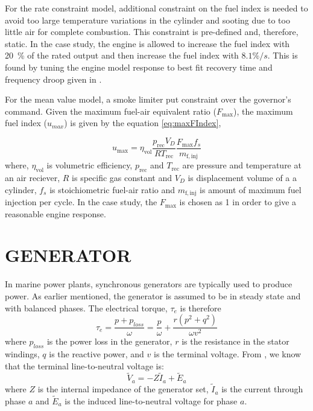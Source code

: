 \documentclass[twocolumn,10pt]{asme2e}
\begin{document}
For the rate constraint model, additional constraint on the fuel index is needed to avoid too large temperature variations in the cylinder and sooting due to too little air for complete combustion. This constraint is pre-defined and, therefore, static. In the case study, the engine is allowed to increase the fuel index with 20~\% of the rated output and then increase the fuel index with $8.1 \%/s$. This is found by tuning the engine model response to best fit recovery time and frequency droop given in \cite{MANEnginesandSystems2013}.

For the mean value model, a smoke limiter put constraint over the governor's command. Given the maximum fuel-air equivalent ratio ($F_\mathrm{max}$), the maximum fuel index ($u_{max}$) is given by the equation \ref{eq:maxFIndex},

\begin{equation}
\label{eq:maxFIndex}
u_\mathrm{max} = \eta_\mathrm{vol}\frac{p_\mathrm{rec}V_{D}}{RT_\mathrm{rec}} \frac{F_\mathrm{max}f_s}{m_\mathrm{f,inj}}
\end{equation}
where, $\eta_\mathrm{vol}$ is volumetric efficiency, $p_\mathrm{rec}$ and $T_\mathrm{rec}$ are pressure and temperature at an air reciever, $R$ is specific gas constant and $V_D$ is displacement volume of a a cylinder, $f_s$ is stoichiometric fuel-air ratio and $m_\mathrm{f,inj}$ is amount of maximum fuel injection per cycle. In the case study, the $F_\mathrm{max}$ is chosen as 1 in order to give a reasonable engine response.

\section*{\uppercase{Generator}}
In marine power plants, synchronous generators are typically used to produce power.
As earlier mentioned, the generator is assumed to be in steady state and with balanced phases.
The electrical torque, $\tau_e$ is therefore 
\begin{equation}
\tau_{e} = \dfrac{p+p_{loss}}{\omega} = \dfrac{p}{\omega}+\dfrac{r(p^2+q^2)}{\omega v^2}
\end{equation}
where $p_{loss}$ is the power loss in the generator, $r$ is the resistance in the stator windings, $q$ is the reactive power, and $v$ is the terminal voltage.
From \cite{Krause2002}, we know that the terminal line-to-neutral voltage is:
\begin{equation}
\tilde{V}_a=-Z \tilde{I}_a+\tilde{E}_a
\end{equation}
where $Z$ is the internal impedance of the generator set, $\tilde{I}_a$ is the current through phase $a$ and $\tilde{E}_a$ is the induced line-to-neutral voltage for phase $a$.
\end{document}

